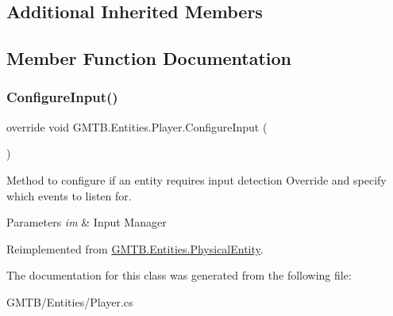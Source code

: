 \subsection*{Additional Inherited Members}


\subsection{Member Function Documentation}
\mbox{\label{class_g_m_t_b_1_1_entities_1_1_player_af7c91590f66efe071a0dec4853c30265}} 
\subsubsection{\texorpdfstring{ConfigureInput()}{ConfigureInput()}}
{\footnotesize\ttfamily override void G\+M\+T\+B.\+Entities.\+Player.\+Configure\+Input (\begin{DoxyParamCaption}{ }\end{DoxyParamCaption})\hspace{0.3cm}{\ttfamily [virtual]}}



Method to configure if an entity requires input detection Override and specify which events to listen for. 


\begin{DoxyParams}{Parameters}
{\em im} & Input Manager \\
\hline
\end{DoxyParams}


Reimplemented from \mbox{\hyperlink{class_g_m_t_b_1_1_entities_1_1_physical_entity_ac8ffd1ce4e40a17980f70b97e941451c}{G\+M\+T\+B.\+Entities.\+Physical\+Entity}}.



The documentation for this class was generated from the following file\+:\begin{DoxyCompactItemize}
\item 
G\+M\+T\+B/\+Entities/Player.\+cs\end{DoxyCompactItemize}
